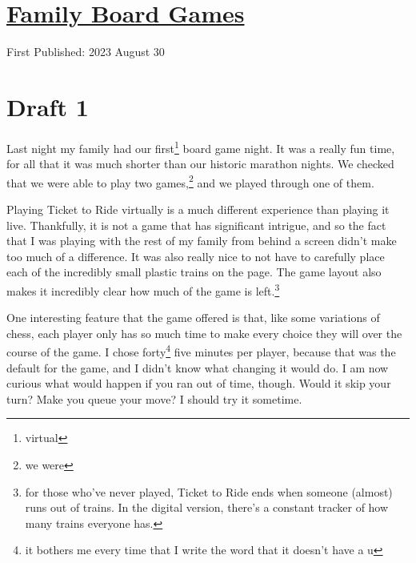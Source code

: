 \documentclass[12pt]{article}[titlepage]
\newcommand{\1}{\={a}}
\newcommand{\2}{\={e}}
\newcommand{\3}{\={\i}}
\newcommand{\4}{\=o}
\newcommand{\5}{\=u}
\newcommand{\6}{\={A}}
\renewcommand{\,}{\textsuperscript{,}}
\begin{document}
\doublespacing
\section{\href{board-game-night.html}{Family Board Games}}
First Published: 2023 August 30
\section{Draft 1}
Last night my family had our first\footnote{virtual} board game night.
It was a really fun time, for all that it was much shorter than our historic marathon nights.
We checked that we were able to play two games,\footnote{we were} and we played through one of them.

Playing Ticket to Ride virtually is a much different experience than playing it live.
Thankfully, it is not a game that has significant intrigue, and so the fact that I was playing with the rest of my family from behind a screen didn't make too much of a difference.
It was also really nice to not have to carefully place each of the incredibly small plastic trains on the page.
The game layout also makes it incredibly clear how much of the game is left.\footnote{for those who've never played, Ticket to Ride ends when someone (almost) runs out of trains. In the digital version, there's a constant tracker of how many trains everyone has.}

One interesting feature that the game offered is that, like some variations of chess, each player only has so much time to make every choice they will over the course of the game.
I chose forty\footnote{it bothers me every time that I write the word that it doesn't have a u} five minutes per player, because that was the default for the game, and I didn't know what changing it would do.
I am now curious what would happen if you ran out of time, though.
Would it skip your turn?
Make you queue your move?
I should try it sometime.
\end{document}
